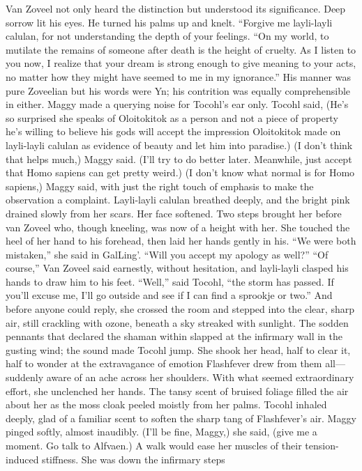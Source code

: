 \documentclass[9pt]{article}
\begin{document}
Van Zoveel not only heard the distinction but understood its significance. Deep sorrow lit his eyes.
He turned his palms up and knelt. “Forgive me layli-layli calulan, for not understanding the depth of
your feelings.
“On my world, to mutilate the remains of someone after death is the height of cruelty. As I listen to
you now, I realize that your dream is strong enough to give meaning to your acts, no matter how they
might have seemed to me in my ignorance.” His manner was pure Zoveelian but his words were Yn; his
contrition was equally comprehensible in either.
Maggy made a querying noise for Tocohl’s ear only. Tocohl said, (He’s so surprised she speaks of
Oloitokitok as a person and not a piece of property he’s willing to believe his gods will accept the
impression Oloitokitok made on layli-layli calulan as evidence of beauty and let him into paradise.)
(I don’t think that helps much,) Maggy said.
(I’ll try to do better later. Meanwhile, just accept that Homo sapiens can get pretty weird.)
(I don’t know what normal is for Homo sapiens,) Maggy said, with just the right touch of emphasis
to make the observation a complaint.
Layli-layli calulan breathed deeply, and the bright pink drained slowly from her scars. Her face
softened. Two steps brought her before van Zoveel who, though kneeling, was now of a height with her.
She touched the heel of her hand to his forehead, then laid her hands gently in his. “We were both
mistaken,” she said in GalLing’. “Will you accept my apology as well?”
“Of course,” Van Zoveel said earnestly, without hesitation, and layli-layli clasped his hands to draw
him to his feet.
“Well,” said Tocohl, “the storm has passed. If you’ll excuse me, I’ll go outside and see if I can find a
sprookje or two.” And before anyone could reply, she crossed the room and stepped into the clear,
sharp air, still crackling with ozone, beneath a sky streaked with sunlight.
The sodden pennants that declared the shaman within slapped at the infirmary wall in the gusting
wind; the sound made Tocohl jump. She shook her head, half to clear it, half to wonder at the
extravagance of emotion Flashfever drew from them all—suddenly aware of an ache across her
shoulders.
With what seemed extraordinary effort, she unclenched her hands. The tansy scent of bruised foliage
filled the air about her as the moss cloak peeled moistly from her palms. Tocohl inhaled deeply, glad of a
familiar scent to soften the sharp tang of Flashfever’s air.
Maggy pinged softly, almost inaudibly.
(I’ll be fine, Maggy,) she said, (give me a moment. Go talk to Alfvaen.)
A walk would ease her muscles of their tension-induced stiffness. She was down the infirmary steps
\end{document}
